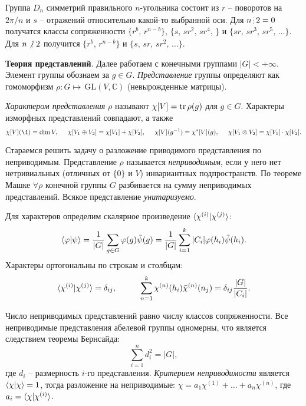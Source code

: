 Группа $D_n$ симметрий правильного $n$-угольника состоит из  $r$ -- поворотов на ${2\pi}/{n}$ и $s$ -- отражений относительно какой-то выбранной оси.
Для $n \2 2 = 0$ получатся классы сопряженности  $\{r^b,\,  r^{n-b}\}$, $\{s,\,  s r^2,\, s r^4,\, \}$ и $\{s r,\, s r^3,\, s r^5,\, \ldots\}$. Для $n \not{\hspace{-1.5pt}\2}\, 2$ получится $\{r^b,\, r^{n-b}\}$ и $\{s,\, s r,\,  sr^2,\, \ldots\}$. 


\textbf{Теория представлений}. Далее работаем с конечными группами $|G| < + \infty$. Элемент группы обознаем за $g \in G$. \textit{Представление} группы определяют как гомоморфизм $\rho\colon G \mapsto \,\text{GL}(V, \mathbb{C})$ (невырожденные матрицы). 


\textit{Характером представления} $\rho$ называют $\chi[V] = \mathop{\mathrm{tr}}\nolimits \rho(g)$ для $g \in G$. Характеры изморфных представлений совпадают, а также
\begin{equation*}
	\chi[V](\1) = \dim V,
	\hspace{5 mm} 
	\chi[V_1 \oplus V_2]= \chi[V_1] + \chi[V_2],
	\hspace{5 mm} 
	\chi[V] (g^{-1}) = \chi^*[V] (g),
	\hspace{5 mm} 
	\chi[V_1 \otimes V_2] = \chi[V_1] \cdot \chi[V_2].
\end{equation*}

Стараемся решить задачу о разложение приводимого представления по неприводимым. 
Представление $\rho$ называется \textit{неприводимым}, если у него нет нетривиальных (отличных от $\{0\}$ и $V$) инвариантных подпространств. По теореме Машке $\forall \rho$ конечной группы $G$ разбивается на сумму неприводимых представлений. Всякое представление \textit{унитаризуемо}. 


Для характеров определим скалярное произведение $\bk{\chi^{(i)}}{\chi^{(j)}}$:
\begin{equation*}
\bk{\varphi}{\psi} = 
	\frac{1}{|G|} \sum_{g \in G} \varphi(g) \bar{\psi}(g) = \frac{1}{|G|} \sum_{i=1}^{k} |C_i| \varphi(h_i) \bar{\psi} (h_i).
\end{equation*}
Характеры ортогональны по строкам и столбцам:
\begin{equation*}
	\bk{\chi^{(i)}}{\chi^{(j)}} = \delta_{ij},
	\hspace{10 mm} 
	\sum_{n=1}^{k} \chi^{(n)} (h_i) \bar{\chi}^{(n)} (n_j) = \delta_{ij} \frac{|G|}{|C_i|}.
\end{equation*}


Число неприводимых представлений равно числу классов сопряженности. Все неприводимые представления абелевой группы одномерны, что является следствием теоремы Бернсайда:
\begin{equation*}
	\sum_{i=1}^{n} d_i^2 = |G|,
\end{equation*}
где $d_i$ -- размерность $i$-го представления. 
\textit{Критерием неприводимости} является $\bk{\chi}{\chi} = 1$,
тогда разложение на неприводимые: $\chi = a_1 \chi^{(1)} + \ldots + a_n \chi^{(n)}$, где $a_i = \bk{\chi}{\chi^{(i)}}$.

